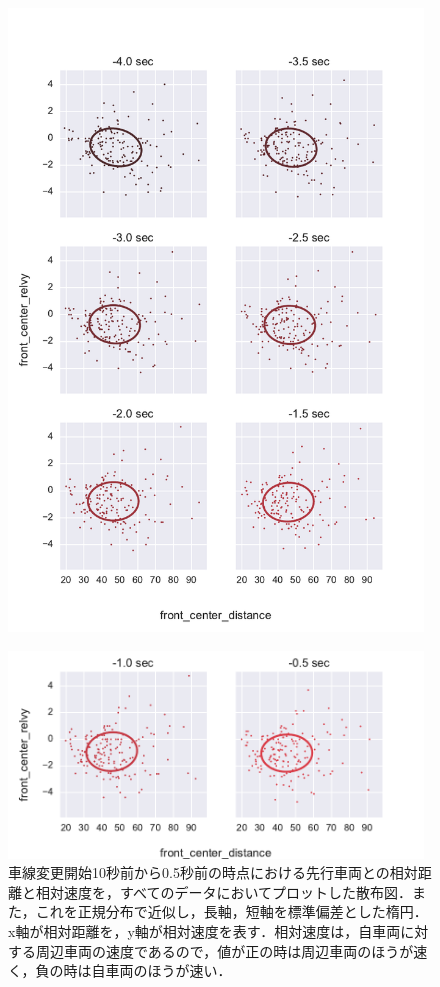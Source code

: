 \begin{figure}[p]
  \centering
    \includegraphics[width=11cm,keepaspectratio]{fig/scatter_ellipse_front_center_distance_front_center_relvy2.pdf}
\end{figure}
\begin{figure}[t]
  \centering
    \includegraphics[width=11cm,keepaspectratio]{fig/scatter_ellipse_front_center_distance_front_center_relvy3.pdf}
  \caption{車線変更開始10秒前から0.5秒前の時点における先行車両との相対距離と相対速度を，すべてのデータにおいてプロットした散布図．また，これを正規分布で近似し，長軸，短軸を標準偏差とした楕円．x軸が相対距離を，y軸が相対速度を表す．相対速度は，自車両に対する周辺車両の速度であるので，値が正の時は周辺車両のほうが速く，負の時は自車両のほうが速い．}
  \label{fig:scatter_ellipse}
\end{figure}

